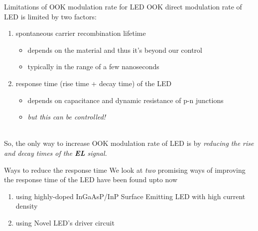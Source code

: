 \documentclass[mathserif]{beamer}
\begin{document}
    \begin{frame}{Limitations of OOK modulation rate for LED}
        \pause
        OOK direct modulation rate of LED is limited by two factors:
        
        \begin{enumerate}
            
            \pause \item spontaneous carrier recombination lifetime
            \begin{itemize}
                \pause \item depends on the material and thus it's beyond our control
                \pause \item typically in the range of a few nanoseconds
            \end{itemize}
            
            \pause \item response time (rise time + decay time) of the LED  
            \begin{itemize}
                \pause \item depends on capacitance and dynamic resistance of p-n junctions
                \pause \item \emph{but this can be controlled!} \\~\\
            \end{itemize}
            
        \end{enumerate}
        
        \pause
        So, the only way to increase OOK modulation rate of LED is by \emph{reducing the rise and decay times of the \textbf{EL} signal.}       
    \end{frame}


   
    \begin{frame}{Ways to reduce the response time}
        \pause
        We look at \emph{two} promising ways of improving the response time of the LED have been found upto now
        \begin{enumerate}
            \pause \item using highly-doped InGaAsP/InP Surface Emitting LED with high current density
            \pause \item using Novel LED's driver circuit \\~\\
        \end{enumerate}
        
    \end{frame}
    
\end{document}
